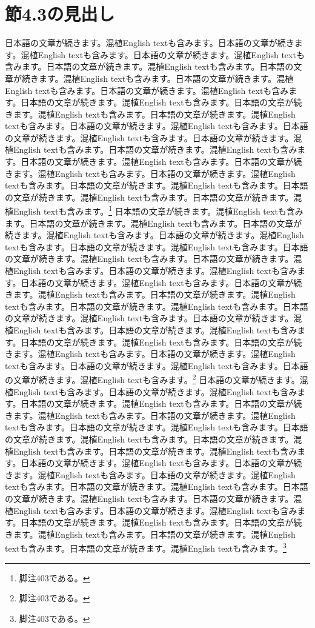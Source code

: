 \documentclass[pdflatex,book]{jlreq}
\begin{document}
\section{節4.3の見出し}
日本語の文章が続きます。混植English textも含みます。日本語の文章が続きます。混植English textも含みます。日本語の文章が続きます。混植English textも含みます。日本語の文章が続きます。混植English textも含みます。日本語の文章が続きます。混植English textも含みます。日本語の文章が続きます。混植English textも含みます。日本語の文章が続きます。混植English textも含みます。日本語の文章が続きます。混植English textも含みます。日本語の文章が続きます。混植English textも含みます。日本語の文章が続きます。混植English textも含みます。日本語の文章が続きます。混植English textも含みます。日本語の文章が続きます。混植English textも含みます。日本語の文章が続きます。混植English textも含みます。日本語の文章が続きます。混植English textも含みます。日本語の文章が続きます。混植English textも含みます。日本語の文章が続きます。混植English textも含みます。日本語の文章が続きます。混植English textも含みます。日本語の文章が続きます。混植English textも含みます。日本語の文章が続きます。混植English textも含みます。日本語の文章が続きます。混植English textも含みます。\footnote{脚注403である。}
日本語の文章が続きます。混植English textも含みます。日本語の文章が続きます。混植English textも含みます。日本語の文章が続きます。混植English textも含みます。日本語の文章が続きます。混植English textも含みます。日本語の文章が続きます。混植English textも含みます。日本語の文章が続きます。混植English textも含みます。日本語の文章が続きます。混植English textも含みます。日本語の文章が続きます。混植English textも含みます。日本語の文章が続きます。混植English textも含みます。日本語の文章が続きます。混植English textも含みます。日本語の文章が続きます。混植English textも含みます。日本語の文章が続きます。混植English textも含みます。日本語の文章が続きます。混植English textも含みます。日本語の文章が続きます。混植English textも含みます。日本語の文章が続きます。混植English textも含みます。日本語の文章が続きます。混植English textも含みます。日本語の文章が続きます。混植English textも含みます。日本語の文章が続きます。混植English textも含みます。日本語の文章が続きます。混植English textも含みます。日本語の文章が続きます。混植English textも含みます。\footnote{脚注403である。}
日本語の文章が続きます。混植English textも含みます。日本語の文章が続きます。混植English textも含みます。日本語の文章が続きます。混植English textも含みます。日本語の文章が続きます。混植English textも含みます。日本語の文章が続きます。混植English textも含みます。日本語の文章が続きます。混植English textも含みます。日本語の文章が続きます。混植English textも含みます。日本語の文章が続きます。混植English textも含みます。日本語の文章が続きます。混植English textも含みます。日本語の文章が続きます。混植English textも含みます。日本語の文章が続きます。混植English textも含みます。日本語の文章が続きます。混植English textも含みます。日本語の文章が続きます。混植English textも含みます。日本語の文章が続きます。混植English textも含みます。日本語の文章が続きます。混植English textも含みます。日本語の文章が続きます。混植English textも含みます。日本語の文章が続きます。混植English textも含みます。日本語の文章が続きます。混植English textも含みます。日本語の文章が続きます。混植English textも含みます。日本語の文章が続きます。混植English textも含みます。\footnote{脚注403である。}
\end{document}
